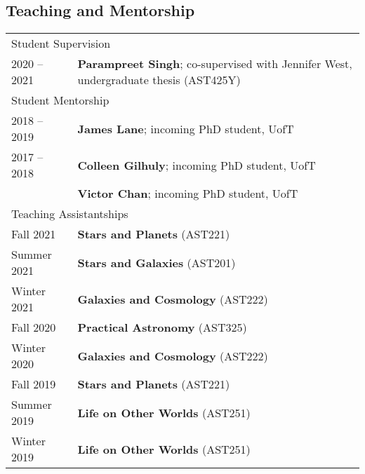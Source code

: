 \documentclass[10pt]{res} %
\begin{document}
\begin{resume}
\section{\Large Teaching and Mentorship}
\vspace{-5pt} %
\noindent\makebox[\linewidth]{\rule{\textwidth}{0.4pt}}
\vspace{-20pt} %
\begin{table}[h!]
\begin{tabularx}{\textwidth}{ @{} p{6.5em} X @{} }
%
%
\multicolumn{2}{l}{ \rule{0pt}{3ex} \large \hspace{-12pt} Student Supervision \dotfill \rule[-1.2ex]{0pt}{0pt}} \\
2020 -- 2021 & \textbf{Parampreet Singh}; co-supervised with Jennifer West, undergraduate thesis (AST425Y) \\
%
%
\multicolumn{2}{l}{ \rule{0pt}{3ex} \large \hspace{-12pt} Student Mentorship \dotfill \rule[-1.2ex]{0pt}{0pt}} \\
2018 -- 2019 & \textbf{James Lane}; incoming PhD student, UofT \\
2017 -- 2018 & \textbf{Colleen Gilhuly}; incoming PhD student, UofT \\
                     & \textbf{Victor Chan}; incoming PhD student, UofT \\
%
%
\multicolumn{2}{l}{ \rule{0pt}{3ex} \large \hspace{-12pt} Teaching Assistantships \dotfill \rule[-1.2ex]{0pt}{0pt}} \\
Fall 2021        & \textbf{Stars and Planets} (AST221) \\
Summer 2021 & \textbf{Stars and Galaxies} (AST201) \\
Winter 2021    & \textbf{Galaxies and Cosmology} (AST222) \\
Fall 2020         & \textbf{Practical Astronomy} (AST325) \\
Winter 2020    & \textbf{Galaxies and Cosmology} (AST222) \\
Fall 2019         & \textbf{Stars and Planets} (AST221) \\
Summer 2019 & \textbf{Life on Other Worlds} (AST251) \\
Winter 2019    & \textbf{Life on Other Worlds} (AST251) \\

\end{tabularx}
\end{table}
\end{resume}
\end{document}
